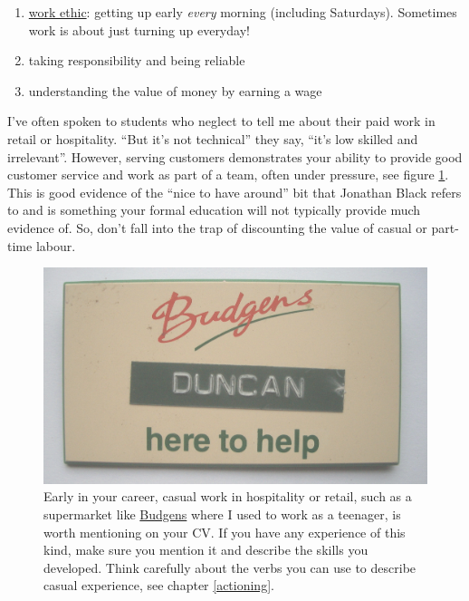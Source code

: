 \documentclass[
]{book}
\providecommand{\tightlist}{%
  \setlength{\itemsep}{0pt}\setlength{\parskip}{0pt}}
\begin{document}
\begin{enumerate}
\def\labelenumi{\arabic{enumi}.}
\tightlist
\item
  \href{https://en.wikipedia.org/wiki/Work_ethic}{work ethic}: getting up early \emph{every} morning (including Saturdays). Sometimes work is about just turning up everyday!
\item
  taking responsibility and being reliable
\item
  understanding the value of money by earning a wage
\end{enumerate}

I've often spoken to students who neglect to tell me about their paid work in retail or hospitality. ``But it's not technical'' they say, ``it's low skilled and irrelevant''. However, serving customers demonstrates your ability to provide good customer service and work as part of a team, often under pressure, see figure \ref{fig:budgens-fig}. This is good evidence of the ``nice to have around'' bit that Jonathan Black refers to \citep{topnotchcv} and is something your formal education will not typically provide much evidence of. So, don't fall into the trap of discounting the value of casual or part-time labour.

\begin{figure}

{\centering \includegraphics[width=1\linewidth]{images/budgens} 

}

\caption{Early in your career, casual work in hospitality or retail, such as a supermarket like \href{https://en.wikipedia.org/wiki/Budgens}{Budgens} where I used to work as a teenager, is worth mentioning on your CV. If you have any experience of this kind, make sure you mention it and describe the skills you developed. Think carefully about the verbs you can use to describe casual experience, see chapter \ref{actioning}.}\label{fig:budgens-fig}
\end{figure}
\end{document}
